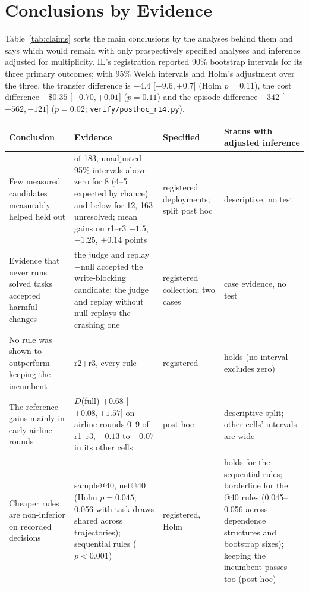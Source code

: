 \documentclass[11pt]{article}
\begin{document}
\section{Conclusions by Evidence}
\label{app:claims}

Table~\ref{tab:claims} sorts the main conclusions by the analyses behind them and says which would remain with only prospectively specified analyses and inference adjusted for multiplicity. IL's registration reported 90\% bootstrap intervals for its three primary outcomes; with 95\% Welch intervals and Holm's adjustment over the three, the transfer difference is $-4.4$ [$-9.6,+0.7$] (Holm $p=0.11$), the cost difference $-\$0.35$ [$-0.70,+0.01$] ($p=0.11$) and the episode difference $-342$ [$-562,-121$] ($p=0.02$; \texttt{verify/posthoc\_r14.py}).

\begin{table}[t]
\centering\footnotesize
\setlength{\tabcolsep}{3pt}
\begin{tabular}{@{}>{\raggedright\arraybackslash}p{4.0cm}>{\raggedright\arraybackslash}p{5.1cm}>{\raggedright\arraybackslash}p{2.6cm}>{\raggedright\arraybackslash}p{3.6cm}@{}}
\toprule
Conclusion & Evidence & Specified & Status with adjusted inference \\
\midrule
Few measured candidates measurably helped held out & of 183, unadjusted 95\% intervals above zero for 8 (4--5 expected by chance) and below for 12, 163 unresolved; mean gains on r1--r3 $-1.5$, $-1.25$, $+0.14$ points & registered deployments; split post hoc & descriptive, no test \\
Evidence that never runs solved tasks accepted harmful changes & the judge and replay$-$null accepted the write-blocking candidate; the judge and replay without null replays the crashing one & registered collection; two cases & case evidence, no test \\
No rule was shown to outperform keeping the incumbent & r2+r3, every rule & registered & holds (no interval excludes zero) \\
The reference gains mainly in early airline rounds & $D$(full) $+0.68$ [$+0.08,+1.57$] on airline rounds 0--9 of r1--r3, $-0.13$ to $-0.07$ in its other cells & post hoc & descriptive split; other cells' intervals are wide \\
Cheaper rules are non-inferior on recorded decisions & sample@40, net@40 (Holm $p=0.045$; 0.056 with task draws shared across trajectories); sequential rules ($p<0.001$) & registered, Holm & holds for the sequential rules; borderline for the @40 rules (0.045--0.056 across dependence structures and bootstrap sizes); keeping the incumbent passes too (post hoc) \\

\end{tabular}
\end{table}
\end{document}
